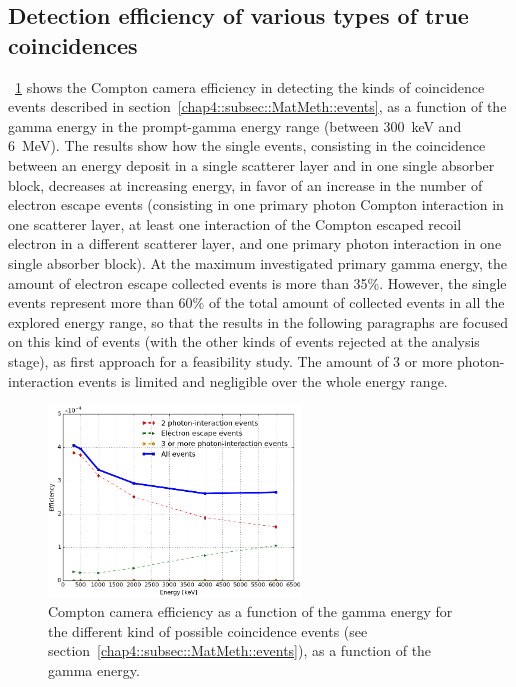 \subsection{Detection efficiency of various types of true coincidences}\label{chap4::subsec::Results_relefficiency}
\figurename~\ref{chap4::fig::eff_evKind} shows the Compton camera efficiency in detecting the kinds of coincidence events described in section~\ref{chap4::subsec::MatMeth::events}, as a function of the gamma energy in the prompt-gamma energy range (between 300~keV and 6~MeV). The results show how the single events, consisting in the coincidence between an energy deposit in a single scatterer layer and in one single absorber block, decreases at increasing energy, in favor of an increase in the number of electron escape events (consisting in one primary photon Compton interaction in one scatterer layer, at least one interaction of the Compton escaped recoil electron in a different scatterer layer, and one primary photon interaction in one single absorber block). At the maximum investigated primary gamma energy,  the amount of electron escape collected events is more than 35\%. However, the single events represent more than 60\% of the total amount of collected events in all the explored energy range, so that the results in the following paragraphs are focused on this kind of events (with the other kinds of events rejected at the analysis stage), as first approach for a feasibility study. The amount of 3 or more photon-interaction events is limited and negligible over the whole energy range.

\begin{figure} [!hbtp]	
\centering
\includegraphics[width=0.6\textwidth]{03_GraphicFiles/chapter4_HTsimu/new/effVSenergy_trigger.png}
\caption{Compton camera efficiency as a function of the gamma energy for the different kind of possible coincidence events (see section~\ref{chap4::subsec::MatMeth::events}), as a function of the gamma energy.}
\label{chap4::fig::eff_evKind}
\end{figure}

